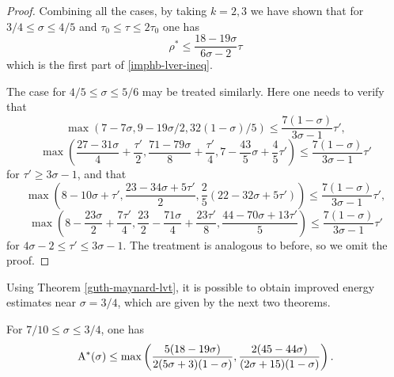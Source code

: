 \begin{proof}
Combining all the cases, by taking $k= 2,3$ we have shown that for $3/4 \le \sigma \le 4/5$ and $\tau_0 \le \tau \le 2\tau_0$ one has
\[
\rho^* \le \frac{18 - 19\sigma}{6\sigma - 2}\tau
\]
which is the first part of \eqref{imphb-lver-ineq}.

The case for $4/5 \le \sigma \le 5/6$ may be treated similarly. Here one needs to verify that
\[
\max(7 - 7\sigma, 9 - 19\sigma/2, 32(1 - \sigma)/5) \le \frac{7(1 - \sigma)}{3\sigma - 1}\tau',
\]
\[
\max\left(\frac{27-31\sigma}{4} + \frac{\tau'}{2}, \frac{71-79\sigma}{8}+\frac{\tau'}{4}, 7-\frac{43}{5}\sigma + \frac{4}{5}\tau'\right) \le \frac{7(1 - \sigma)}{3\sigma - 1}\tau'
\]
for $\tau' \ge 3\sigma - 1$, and that
\[
\max\left(8 -10\sigma + \tau',\frac{23 - 34\sigma + 5\tau'}{2}, \frac{2}{5}(22 - 32\sigma +  5\tau')\right) \le \frac{7(1 - \sigma)}{3\sigma - 1}\tau',
\]
\[
\max\left(8 - \frac{23\sigma}{2} + \frac{7\tau'}{4}, \frac{23}{2} - \frac{71\sigma}{4} + \frac{23\tau'}{8}, \frac{44 - 70\sigma + 13\tau'}{5}\right) \le \frac{7(1 - \sigma)}{3\sigma - 1}\tau'
\]
for $4\sigma - 2 \le \tau' \le 3\sigma - 1$. The treatment is analogous to before, so we omit the proof.
\end{proof}

Using Theorem \ref{guth-maynard-lvt}, it is possible to obtain improved energy estimates near $\sigma = 3/4$, which are given by the next two theorems.

\begin{theorem}\label{imp-energy-bound2}
For $7/10 \le \sigma \le 3/4$, one has
\[
\mathrm{A}^*(\sigma) \le \max\left(\frac{5(18 - 19\sigma)}{2(5\sigma + 3)(1 - \sigma)}, \frac{2(45 - 44\sigma)}{(2\sigma + 15)(1
- \sigma)}\right).
\]
\end{theorem}

\derived
{}

